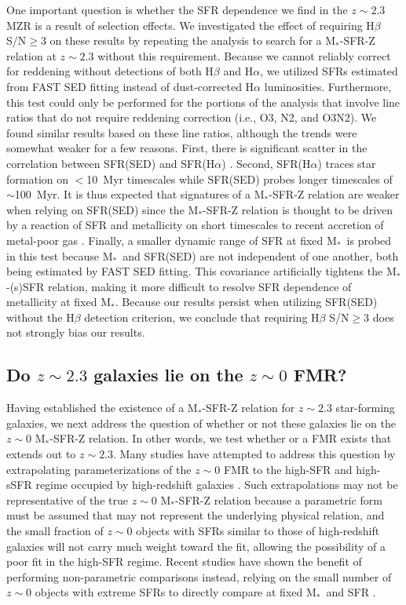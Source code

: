\documentclass[iop,twocolappendix]{emulateapj}
\newcommand{\mstar}{$\mbox{M}_*$}
\begin{document}
One important question is whether the SFR dependence we find in the $z\sim2.3$ MZR
 is a result of selection effects.
  We investigated the effect of requiring H$\beta$ S/N$\geq$3 on these results
 by repeating the analysis to search for a \mstar-SFR-Z relation at $z\sim2.3$ without this requirement. 
  Because we cannot reliably correct for reddening without detections of both H$\beta$ and H$\alpha$,
 we utilized SFRs estimated from FAST SED fitting instead of dust-corrected H$\alpha$ luminosities.
  Furthermore, this test could only be performed for the portions of the analysis that
 involve line ratios that do not require reddening correction (i.e., O3, N2, and O3N2).  
  We found similar results based on these line ratios, although the trends were somewhat weaker
 for a few reasons.  First, there is significant scatter in the correlation between SFR(SED) and SFR(H$\alpha$)
 \citep{red15}.  Second, SFR(H$\alpha$) traces star formation on $<$10~Myr timescales while SFR(SED) probes
 longer timescales of $\sim$100~Myr.  It is thus expected that signatures of a \mstar-SFR-Z relation are
 weaker when relying on SFR(SED) since the \mstar-SFR-Z relation is thought to be driven by a reaction of SFR and
 metallicity on short timescales to recent accretion of metal-poor gas \citep{man10,dav12}.
  Finally, a smaller dynamic range of SFR at fixed \mstar\ is probed in this test because \mstar\ and SFR(SED)
 are not independent of one another, both being estimated by FAST SED fitting.  This covariance artificially
 tightens the \mstar-(s)SFR relation, making it more difficult to resolve SFR dependence of metallicity at
 fixed \mstar.  Because our results persist when utilizing SFR(SED) without the H$\beta$ detection criterion,
 we conclude that requiring H$\beta$ S/N$\geq$3 does not strongly bias our results.

\subsection{Do $z\sim2.3$ galaxies lie on the $z\sim0$ FMR?}

Having established the existence of a \mstar-SFR-Z relation for $z\sim2.3$ star-forming
 galaxies, we next address the question of whether or not these galaxies lie on
 the $z\sim0$ \mstar-SFR-Z relation.  In other words, we test whether or a FMR exists
 that extends out to $z\sim2.3$.
  Many studies have attempted to address
 this question by extrapolating parameterizations of the $z\sim0$ FMR \citep[e.g.,][]{man10,lar10}
 to the high-SFR and high-sSFR regime occupied by high-redshift galaxies
 \citep[e.g.,][]{wuy12,wuy14,chr12,bel13,hen13b,cul14,yab14,zah14b,kas17}.
  Such extrapolations may not be representative of the true $z\sim0$ \mstar-SFR-Z relation
 because a parametric form must be assumed that may not represent the underlying physical
 relation, and
 the small fraction of $z\sim0$ objects with SFRs similar to those of high-redshift galaxies
 will not carry much weight toward the fit,
 allowing the possibility of a poor fit in the high-SFR regime.
  Recent studies have shown the benefit of performing
 non-parametric comparisons instead, relying on the small number of $z\sim0$ objects
 with extreme SFRs to directly compare at fixed \mstar\ and SFR \citep{san15,sal15,ly16}.
\end{document}
